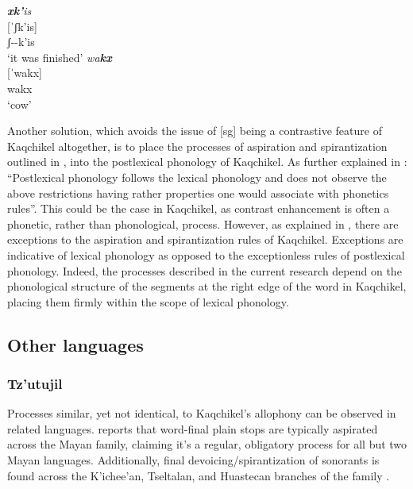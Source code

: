 \documentclass[output=paper,colorlinks,citecolor=brown]{langscibook}
\begin{document}
\begin{multicols}{2}
\ea
    \ea\label{native_xcluster}
    \glll \emph{\textbf{xk’}is}    \\
    {}[ˈʃk’is]   \\
    ʃ-\emptyset-k’is  \\
    \glt ‘it was finished’  
\columnbreak
    \ex\label{loan_xcluster}
    \glll \emph{wa\textbf{kx}} \\
    {}[ˈwakx]    \\
    wakx \\
    \glt ‘cow’ 
    \z
\z
\end{multicols}

Another solution, which avoids the issue of [sg] being a contrastive feature of Kaqchikel altogether, is to place the processes of aspiration and spirantization outlined in , into the postlexical phonology of Kaqchikel. As further explained in \citet[118]{Dresher:2009}: “Postlexical phonology follows the lexical phonology and does not observe the above restrictions having rather properties one would associate with phonetics rules”. This could be the case in Kaqchikel, as contrast enhancement is often a phonetic, rather than phonological, process. However, as explained in , there are exceptions to the aspiration and spirantization rules of Kaqchikel. Exceptions are indicative of lexical phonology as opposed to the exceptionless rules of postlexical phonology. Indeed, the processes described in the current research depend on the phonological structure of the segments at the right edge of the word in Kaqchikel, placing them firmly within the scope of lexical phonology.



\subsection{Other languages}\label{Other languages}
\subsubsection{Tz’utujil}\label{Tz’utujil}
Processes similar, yet not identical, to Kaqchikel’s allophony can be observed in related languages. \citet{Bennett:2016} reports that word-final plain stops are typically aspirated across the Mayan family, claiming it’s a regular, obligatory process for all but two Mayan languages. Additionally, final devoicing/spirantization of sonorants is found across the K’ichee’an, Tseltalan, and Huastecan branches of the family \citep{Bennett:2016}.
\end{document}
